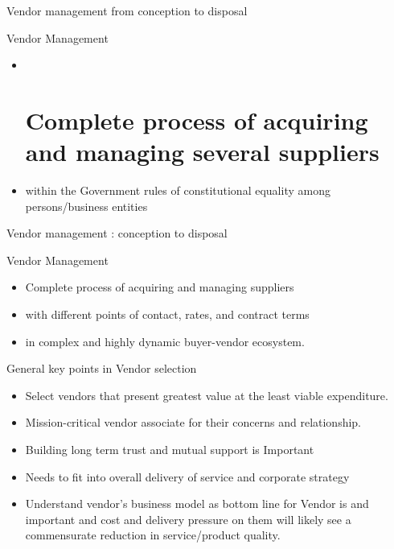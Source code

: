 \documentclass[
  10pt,
  ignorenonframetext,
  aspectratio=43,
]{beamer}
\providecommand{\tightlist}{%
  \setlength{\itemsep}{0pt}\setlength{\parskip}{0pt}}
\begin{document}
\begin{frame}{Vendor management from conception to disposal}
\protect\hypertarget{vendor-management-from-conception-to-disposal}{}
\begin{block}{Vendor Management}
\protect\hypertarget{vendor-management}{}
\begin{itemize}
\item ~
  \hypertarget{complete-process-of-acquiring-and-managing-several-suppliers}{%
  \section{Complete process of acquiring and managing several
  suppliers}\label{complete-process-of-acquiring-and-managing-several-suppliers}}
\item
  within the Government rules of constitutional equality among
  persons/business entities
\end{itemize}
\end{block}
\end{frame}

\begin{frame}{Vendor management : conception to disposal}
\protect\hypertarget{vendor-management-conception-to-disposal}{}
\begin{block}{Vendor Management}
\protect\hypertarget{vendor-management-1}{}
\begin{itemize}
\tightlist
\item
  Complete process of acquiring and managing suppliers
\item
  with different points of contact, rates, and contract terms
\item
  in complex and highly dynamic buyer-vendor ecosystem.
\end{itemize}
\end{block}

\begin{block}{General key points in Vendor selection}
\protect\hypertarget{general-key-points-in-vendor-selection}{}
\begin{itemize}
\tightlist
\item
  Select vendors that present greatest value at the least viable
  expenditure.
\item
  Mission-critical vendor associate for their concerns and relationship.
\item
  Building long term trust and mutual support is Important
\item
  Needs to fit into overall delivery of service and corporate strategy
\item
  Understand vendor's business model as bottom line for Vendor is and
  important and cost and delivery pressure on them will likely see a
  commensurate reduction in service/product quality.
\end{itemize}
\end{block}
\end{frame}
\end{document}
